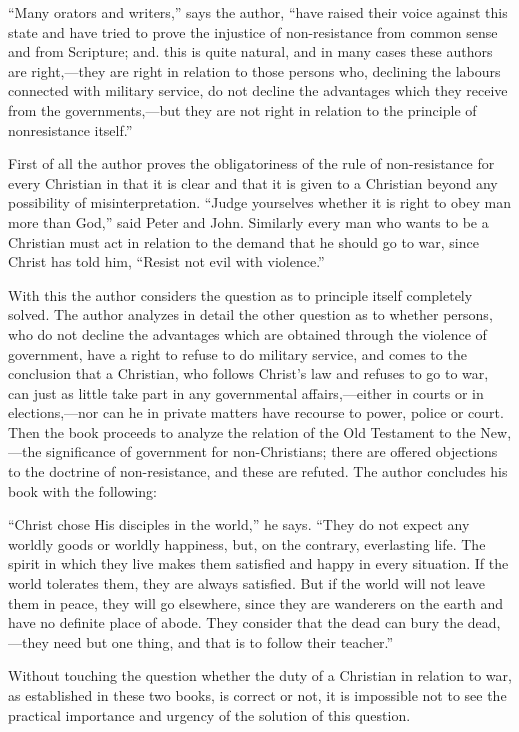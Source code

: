 \documentclass{book}
\begin{document}
“Many orators and writers,” says the author, “have raised their voice against this state and have tried to prove the injustice of non-resistance from common sense and from Scripture; and. this is quite natural, and in many cases these authors are right,—they are right in relation to those persons who, declining the labours connected with military service, do not decline the advantages which they receive from the governments,—but they are not right in relation to the principle of nonresistance itself.”

First of all the author proves the obligatoriness of the rule of non-resistance for every Christian in that it is clear and that it is given to a Christian beyond any possibility of misinterpretation. “Judge yourselves whether it is right to obey man more than God,” said Peter and John. Similarly every man who wants to be a Christian must act in relation to the demand that he should go to war, since Christ has told him, “Resist not evil with violence.”

With this the author considers the question as to principle itself completely solved. The author analyzes in detail the other question as to whether persons, who do not decline the advantages which are obtained through the violence of government, have a right to refuse to do military service, and comes to the conclusion that a Christian, who follows Christ’s law and refuses to go to war, can just as little take part in any governmental affairs,—either in courts or in elections,—nor can he in private matters have recourse to power, police or court. Then the book proceeds to analyze the relation of the Old Testament to the New,—the significance of government for non-Christians; there are offered objections to the doctrine of non-resistance, and these are refuted. The author concludes his book with the following:

“Christ chose His disciples in the world,” he says. “They do not expect any worldly goods or worldly happiness, but, on the contrary, everlasting life. The spirit in which they live makes them satisfied and happy in every situation. If the world tolerates them, they are always satisfied. But if the world will not leave them in peace, they will go elsewhere, since they are wanderers on the earth and have no definite place of abode. They consider that the dead can bury the dead,—they need but one thing, and that is to follow their teacher.”

Without touching the question whether the duty of a Christian in relation to war, as established in these two books, is correct or not, it is impossible not to see the practical importance and urgency of the solution of this question.
\end{document}
